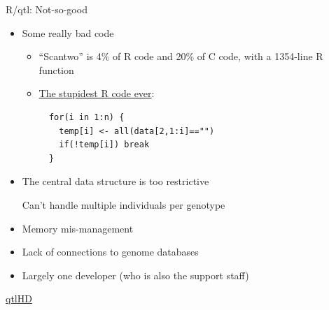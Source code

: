 \documentclass[12pt]{article}
\newcommand{\headsize}{\fontsize{35}{35} \selectfont}
\newcommand{\smallsize}{\fontsize{25}{30} \selectfont}
\newcommand{\smallersize}{\fontsize{20}{25} \selectfont}
\begin{document}
{\newpage


\headsize \color{myyellow}
\hfill \begin{minipage}{5.75in}
\centering
R/qtl: Not-so-good
\end{minipage}

\vspace{10mm}

\color{mywhite}
\smallsize

\hfill \begin{minipage}{10in}
\begin{itemize}
\itemsep16pt
\item Some really bad code

{\smallersize \color{myblue}
\begin{itemize}
\item ``Scantwo'' is 4\% of R code and 20\%
  of C code, with a 1354-line R function

\item \href{http://kbroman.wordpress.com/2011/08/17/the-stupidest-r-code-ever/}{The stupidest R code ever}:
\begin{verbatim}
  for(i in 1:n) {
    temp[i] <- all(data[2,1:i]=="")
    if(!temp[i]) break
  }
\end{verbatim}
\end{itemize}
}

\item The central data structure is too restrictive

{\smallersize \color{myblue} Can't handle multiple individuals per genotype}

\item Memory mis-management

\item Lack of connections to genome databases

\item Largely one developer (who is also the support staff)

\end{itemize}
\end{minipage}


\newpage


\headsize \color{myyellow}
\hfill \begin{minipage}{5.75in}
\centering
\href{http://github.com/qtlHD/qtlHD}{qtlHD}
\end{minipage}

}
\end{document}
